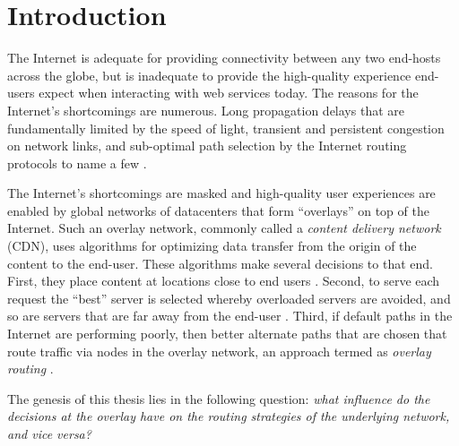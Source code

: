 \chapter{Introduction}
\label{ch:intro}

The Internet is adequate for providing connectivity between any two end-hosts across the globe, but is inadequate to provide the high-quality experience end-users  expect when interacting with web services today.  The reasons for the Internet's shortcomings are numerous. Long propagation delays that are fundamentally limited by the speed of light, transient and persistent congestion on network links, and sub-optimal path selection by the Internet routing protocols to name a few \cite{andersen2001resilient,DilleyMPPSW02,rahul2006overlays,Detour}.

The Internet's shortcomings are masked and high-quality user experiences are enabled by global networks of datacenters that form ``overlays'' on top of the Internet. Such an overlay network, commonly called a \emph{content delivery network} (CDN), uses algorithms for optimizing data transfer from the origin of the content to the end-user. These algorithms make several decisions to that end. First, they place content at locations close to end users \cite{DilleyMPPSW02}. Second, to serve each request the ``best'' server is selected whereby overloaded servers are avoided, and so are servers that are far away from  the end-user \cite{oasis}. Third, if default  paths in the Internet are performing poorly, then better alternate paths that are chosen that route traffic via nodes in the overlay network, an approach termed as \emph{overlay routing} \cite{andersen2001resilient}. 

The genesis of this thesis lies in the following question: 
\emph{what influence do the decisions at the overlay have on the routing strategies of the underlying network, and vice versa?}

